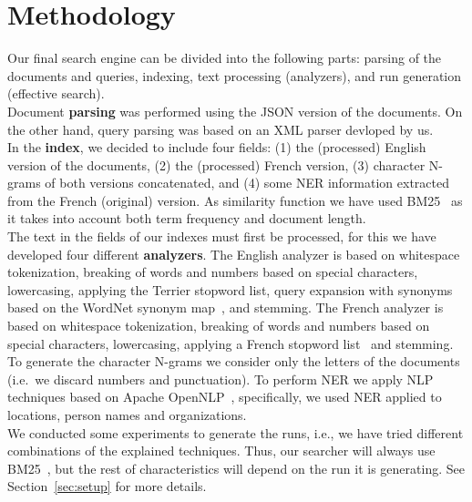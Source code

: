 \section{Methodology}
\label{sec:methodology}

Our final search engine can be divided into the following parts: parsing of the documents and queries, indexing,
text processing (analyzers), and run generation (effective search).\\

Document \textbf{parsing} was performed using the JSON version of the documents.
On the other hand, query parsing was based on an XML parser devloped by us.\\

In the \textbf{index}, we decided to include four fields: (1) the (processed) English version of the documents, (2) the
(processed) French version, (3) character N-grams of both versions concatenated, and (4) some NER information extracted
from the French (original) version.
As similarity function we have used BM25~\cite{BM25} as it takes into account both term frequency and document length.\\

The text in the fields of our indexes must first be processed, for this we have developed four different \textbf{analyzers}.
The English analyzer is based on whitespace tokenization, breaking of words and numbers based on special characters,
lowercasing, applying the Terrier stopword list, query expansion with synonyms based on
the WordNet synonym map~\cite{wordnet}, and stemming.
The French analyzer is based on whitespace tokenization, breaking of words and numbers based on special characters,
lowercasing, applying a French stopword list~\cite{stopword_french} and stemming.
To generate the character N-grams we consider only the letters of the documents (i.e.\ we discard numbers and punctuation).
To perform NER we apply NLP techniques based on Apache OpenNLP~\cite{ApacheOpenNLP}, specifically, we used NER applied
to locations, person names and organizations.\\

We conducted some experiments to generate the runs, i.e., we have tried different combinations of the explained
techniques.
Thus, our searcher will always use BM25~\cite{BM25}, but the rest of characteristics will depend on the run it is
generating.
See Section~\ref{sec:setup} for more details.